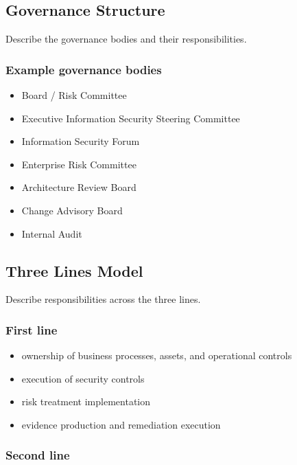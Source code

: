 \documentclass[
  letterpaper,
  DIV=11,
  numbers=noendperiod]{scrartcl}
\providecommand{\tightlist}{%
  \setlength{\itemsep}{0pt}\setlength{\parskip}{0pt}}
\begin{document}
\subsection{Governance Structure}\label{governance-structure}

Describe the governance bodies and their responsibilities.

\subsubsection{Example governance
bodies}\label{example-governance-bodies}

\begin{itemize}
\tightlist
\item
  Board / Risk Committee
\item
  Executive Information Security Steering Committee
\item
  Information Security Forum
\item
  Enterprise Risk Committee
\item
  Architecture Review Board
\item
  Change Advisory Board
\item
  Internal Audit
\end{itemize}

\subsection{Three Lines Model}\label{three-lines-model}

Describe responsibilities across the three lines.

\subsubsection{First line}\label{first-line}

\begin{itemize}
\tightlist
\item
  ownership of business processes, assets, and operational controls
\item
  execution of security controls
\item
  risk treatment implementation
\item
  evidence production and remediation execution
\end{itemize}

\subsubsection{Second line}\label{second-line}
\end{document}
